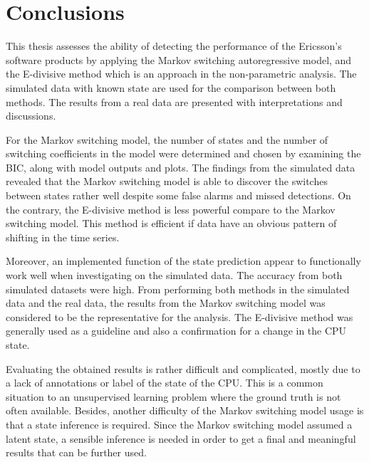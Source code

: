 
\lhead[\chaptername~\thechapter]{\rightmark}

\rhead[\leftmark]{}

\lfoot[\thepage]{}

\cfoot{}

\rfoot[]{\thepage}

\chapter{Conclusions }

This thesis assesses the ability of detecting the performance of the
Ericsson's software products by applying the Markov switching autoregressive
model, and the E-divisive method which is an approach in the non-parametric
analysis. The simulated data with known state are used for the comparison
between both methods. The results from a real data are presented with
interpretations and discussions. 

For the Markov switching model, the number of states and the number
of switching coefficients in the model were determined and chosen
by examining the BIC, along with model outputs and plots. The findings
from the simulated data revealed that the Markov switching model is
able to discover the switches between states rather well despite some
false alarms and missed detections. On the contrary, the E-divisive
method is less powerful compare to the Markov switching model. This
method is efficient if data have an obvious pattern of shifting in
the time series. 

Moreover, an implemented function of the state prediction appear to
functionally work well when investigating on the simulated data. The
accuracy from both simulated datasets were high. From performing both
methods in the simulated data and the real data, the results from
the Markov switching model was considered to be the representative
for the analysis. The E-divisive method was generally used as a guideline
and also a confirmation for a change in the CPU state.

Evaluating the obtained results is rather difficult and complicated,
mostly due to a lack of annotations or label of the state of the CPU.
This is a common situation to an unsupervised learning problem where
the ground truth is not often available. Besides, another difficulty
of the Markov switching model usage is that a state inference is required.
Since the Markov switching model assumed a latent state, a sensible
inference is needed in order to get a final and meaningful results
that can be further used.

